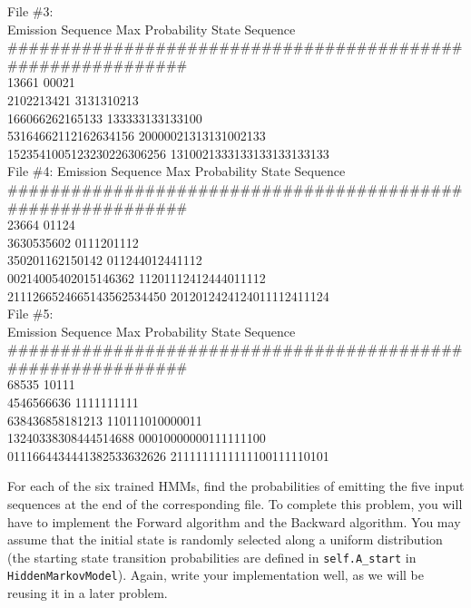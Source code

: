 \begin{solution}
File \#3:\\
Emission Sequence             Max Probability State Sequence\\
\footnotesize\#\#\#\#\#\#\#\#\#\#\#\#\#\#\#\#\#\#\#\#\#\#\#\#\#\#\#\#\#\#\#\#\#\#\#\#\#\#\#\#\#\#\#\#\#\#\#\#\#\#\#\#\#\#\#\#\#\#\#\#\\
13661                         00021      \\                   
2102213421                    3131310213     \\               
166066262165133               133333133133100    \\           
53164662112162634156          20000021313131002133   \\       
1523541005123230226306256     1310021333133133133133133  \\   

File \#4:
Emission Sequence             Max Probability State Sequence\\
\footnotesize\#\#\#\#\#\#\#\#\#\#\#\#\#\#\#\#\#\#\#\#\#\#\#\#\#\#\#\#\#\#\#\#\#\#\#\#\#\#\#\#\#\#\#\#\#\#\#\#\#\#\#\#\#\#\#\#\#\#\#\#\\
23664                         01124           \\              
3630535602                    0111201112       \\             
350201162150142               011244012441112      \\         
00214005402015146362          11201112412444011112   \\       
2111266524665143562534450     2012012424124011112411124   \\  

File \#5:\\
Emission Sequence             Max Probability State Sequence\\
\footnotesize\#\#\#\#\#\#\#\#\#\#\#\#\#\#\#\#\#\#\#\#\#\#\#\#\#\#\#\#\#\#\#\#\#\#\#\#\#\#\#\#\#\#\#\#\#\#\#\#\#\#\#\#\#\#\#\#\#\#\#\#\\
68535                         10111       \\                  
4546566636                    1111111111       \\             
638436858181213               110111010000011      \\         
13240338308444514688          00010000000111111100    \\      
0111664434441382533632626     2111111111111100111110101   \\  

\end{solution}
\indent\problem[17] %
For each of the six trained HMMs, find the probabilities of emitting the five input sequences at the end of the corresponding file. To complete this problem, you will have to implement the Forward algorithm and the Backward algorithm. You may assume that the initial state is randomly selected along a uniform distribution (the starting state transition probabilities are defined in \texttt{self.A\_start} in \texttt{HiddenMarkovModel}). Again, write your implementation well, as we will be reusing it in a later problem. \\


